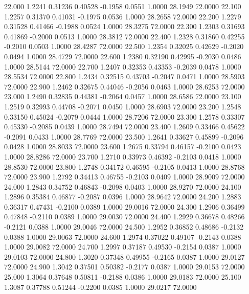   22.000   1.2241   0.31236   0.40528  -0.1958   0.0551   1.0000  28.1949  72.0000
  22.100   1.2257   0.31370   0.41031  -0.1975   0.0536   1.0000  28.2658  72.0000
  22.200   1.2279   0.31528   0.41466  -0.1988   0.0524   1.0000  28.3275  72.0000
  22.300   1.2303   0.31693   0.41869  -0.2000   0.0513   1.0000  28.3812  72.0000
  22.400   1.2328   0.31860   0.42255  -0.2010   0.0503   1.0000  28.4287  72.0000
  22.500   1.2354   0.32025   0.42629  -0.2020   0.0494   1.0000  28.4729  72.0000
  22.600   1.2380   0.32190   0.42995  -0.2030   0.0486   1.0000  28.5144  72.0000
  22.700   1.2407   0.32353   0.43353  -0.2039   0.0478   1.0000  28.5534  72.0000
  22.800   1.2434   0.32515   0.43703  -0.2047   0.0471   1.0000  28.5903  72.0000
  22.900   1.2462   0.32675   0.44046  -0.2056   0.0463   1.0000  28.6253  72.0000
  23.000   1.2490   0.32835   0.44381  -0.2064   0.0457   1.0000  28.6586  72.0000
  23.100   1.2519   0.32993   0.44708  -0.2071   0.0450   1.0000  28.6903  72.0000
  23.200   1.2548   0.33150   0.45024  -0.2079   0.0444   1.0000  28.7206  72.0000
  23.300   1.2578   0.33307   0.45330  -0.2085   0.0439   1.0000  28.7494  72.0000
  23.400   1.2609   0.33466   0.45622  -0.2091   0.0433   1.0000  28.7769  72.0000
  23.500   1.2641   0.33627   0.45899  -0.2096   0.0428   1.0000  28.8033  72.0000
  23.600   1.2675   0.33794   0.46157  -0.2100   0.0423   1.0000  28.8286  72.0000
  23.700   1.2710   0.33973   0.46392  -0.2103   0.0418   1.0000  28.8530  72.0000
  23.800   1.2748   0.34172   0.46595  -0.2105   0.0413   1.0000  28.8768  72.0000
  23.900   1.2792   0.34413   0.46755  -0.2103   0.0409   1.0000  28.9009  72.0000
  24.000   1.2843   0.34752   0.46843  -0.2098   0.0403   1.0000  28.9270  72.0000
  24.100   1.2896   0.35384   0.46877  -0.2087   0.0396   1.0000  28.9642  72.0000
  24.200   1.2883   0.36317   0.47431  -0.2100   0.0389   1.0000  29.0016  72.0000
  24.300   1.2906   0.36499   0.47848  -0.2110   0.0389   1.0000  29.0030  72.0000
  24.400   1.2929   0.36678   0.48266  -0.2121   0.0388   1.0000  29.0046  72.0000
  24.500   1.2952   0.36852   0.48686  -0.2132   0.0388   1.0000  29.0063  72.0000
  24.600   1.2974   0.37022   0.49107  -0.2143   0.0388   1.0000  29.0082  72.0000
  24.700   1.2997   0.37187   0.49530  -0.2154   0.0387   1.0000  29.0103  72.0000
  24.800   1.3020   0.37348   0.49955  -0.2165   0.0387   1.0000  29.0127  72.0000
  24.900   1.3042   0.37501   0.50382  -0.2177   0.0387   1.0000  29.0153  72.0000
  25.000   1.3064   0.37648   0.50811  -0.2188   0.0386   1.0000  29.0183  72.0000
  25.100   1.3087   0.37788   0.51244  -0.2200   0.0385   1.0000  29.0217  72.0000

